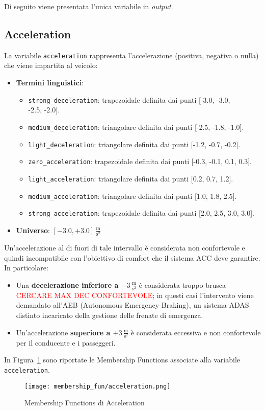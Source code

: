 \vspace{10mm}
\noindent Di seguito viene presentata l'unica variabile in \emph{output}.
\subsection{Acceleration}
La variabile \texttt{acceleration} rappresenta l'accelerazione (positiva, negativa o nulla) che viene impartita al veicolo:
\begin{itemize}
  \item \textbf{Termini linguistici}:
    \begin{itemize}
      \item \texttt{strong\_deceleration}: trapezoidale definita dai punti [-3.0, -3.0, \\ -2.5, -2.0].
      \item \texttt{medium\_deceleration}: triangolare definita dai punti [-2.5, -1.8, -1.0].
      \item \texttt{light\_deceleration}: triangolare definita dai punti [-1.2, -0.7, -0.2].
      \item \texttt{zero\_acceleration}: trapezoidale definita dai punti [-0.3, -0.1, 0.1, 0.3].
      \item \texttt{light\_acceleration}: triangolare definita dai punti [0.2, 0.7, 1.2].
      \item \texttt{medium\_acceleration}: triangolare definita dai punti [1.0, 1.8, 2.5].
      \item \texttt{strong\_acceleration}: trapezoidale definita dai punti [2.0, 2.5, 3.0, 3.0].
    \end{itemize}
  \item \textbf{Universo}: \([-3.0,+3.0]\)\,$\frac{\mathrm{m}}{\mathrm{s^2}}$
\end{itemize}
Un'accelerazione al di fuori di tale intervallo è considerata non confortevole e quindi incompatibile con l'obiettivo di comfort che il sistema ACC deve garantire.  
In particolare:
\begin{itemize}
  \item Una \textbf{decelerazione inferiore a \(-3\,\tfrac{\mathrm{m}}{\mathrm{s^2}}\)} è considerata troppo brusca 
  \textcolor{red}{CERCARE MAX DEC CONFORTEVOLE}; 
  in questi casi l'intervento viene demandato all'AEB (Autonomous Emergency Braking), un sistema ADAS distinto 
  incaricato della gestione delle frenate di emergenza.
  \item Un'accelerazione \textbf{superiore a \(+3\,\tfrac{\mathrm{m}}{\mathrm{s^2}}\)} è considerata eccessiva e non 
  confortevole per il conducente e i passeggeri.
\end{itemize}

\noindent In Figura~\ref{Fig:mf_acceleration} sono riportate le Membership Functions associate alla variabile \texttt{acceleration}.
\begin{figure}[H]
    \centering
    \texttt{[image: membership\_fun/acceleration.png]}
    \caption{Membership Functions di Acceleration}
    \label{Fig:mf_acceleration}
\end{figure}